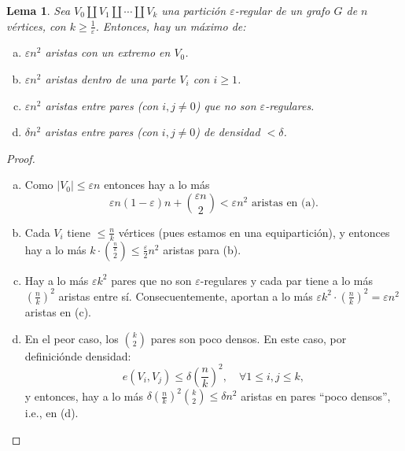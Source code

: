 \documentclass[12pt]{report}
\theoremstyle{plain}
\newtheorem{lemma}[theorem]{Lema}
\theoremstyle{definition}
\newcommand{\abs}[1]{\left \vert #1 \right \vert}
\begin{document}
\begin{lemma}\label{lema:regularidad de szemeredi - lema 1}
Sea $V_0 \coprod V_1 \coprod \cdots \coprod V_k$ una partición $\varepsilon$-regular de un grafo $G$ de $n$ vértices, con $k \geq \frac 1 \varepsilon$. Entonces, hay un máximo de:
\begin{enumerate}[(a)]
\item $\varepsilon n^2$ aristas con un extremo en $V_0$.
\item $\varepsilon n^2$ aristas dentro de una parte $V_i$ con $i\geq 1$.
\item $\varepsilon n^2$ aristas entre pares (con $i,j \neq 0$) que no son $\varepsilon$-regulares.
\item $\delta n^2$ aristas entre pares (con $i,j \neq 0$) de densidad $< \delta$.
\end{enumerate}
\end{lemma}
\begin{proof}
\begin{enumerate}[(a)]
\item Como $\abs{V_0} \leq \varepsilon n$ entonces hay a lo más
\[
    \varepsilon n (1-\varepsilon) n + \binom{\varepsilon n}{2} < \varepsilon n^2 \text{ aristas en (a)}.
\]
\item Cada $V_i$ tiene $\leq \frac n k$ vértices (pues estamos en una equipartición), y entonces hay a lo más $k \cdot \binom{\frac n k}{2} \leq \frac \varepsilon 2 n^2$ aristas para (b).
\item Hay a lo más $\varepsilon k^2$ pares que no son $\varepsilon$-regulares y cada par tiene a lo más $\left ( \frac n k \right)  ^2$ aristas entre sí. Consecuentemente, aportan a lo más $\varepsilon k^2 \cdot \left ( \frac n k \right )^2 = \varepsilon n^2$ aristas en (c).
\item En el peor caso, los $\binom k 2$ pares son poco densos. En este caso, por definiciónde densidad:
\[
    e(V_i, V_j) \leq \delta \left ( \frac n k \right )^2, \quad \forall 1 \leq i, j \leq k,
\]
y entonces, hay a lo más $\delta \left ( \frac n k \right )^2 \binom k 2 \leq \delta n^2$ aristas en pares ``poco densos'', i.e., en (d).
\end{enumerate}
\end{proof}
\end{document}
